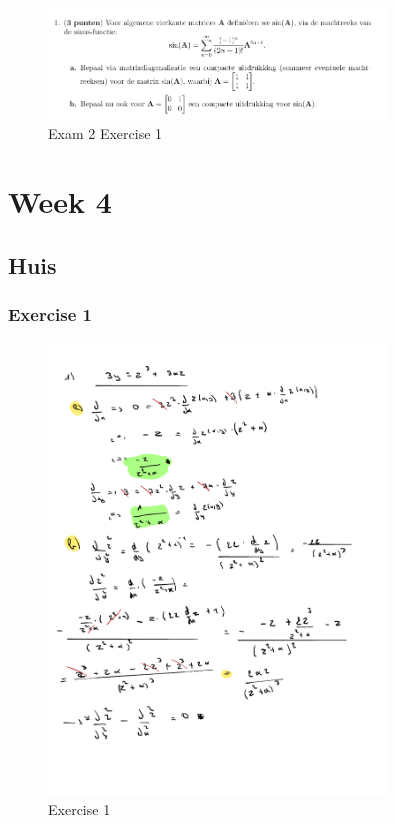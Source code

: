 \documentclass[a4paper]{report}
\begin{document}



\begin{figure}[H]
	\centering
	\includegraphics[width=0.8\textwidth]{assets/exam_2_ex_1.png}
	\caption{Exam 2 Exercise 1}
	\label{fig:exam_2_ex_1}
\end{figure}




\section{Week 4}

\subsection{Huis}

\subsubsection{Exercise 1}

\begin{figure}[H]
	\centering
	\includegraphics[width=0.8\textwidth]{assets/huis_4_ex_1.pdf}
	\caption{Exercise 1}
\end{figure}
\end{document}
